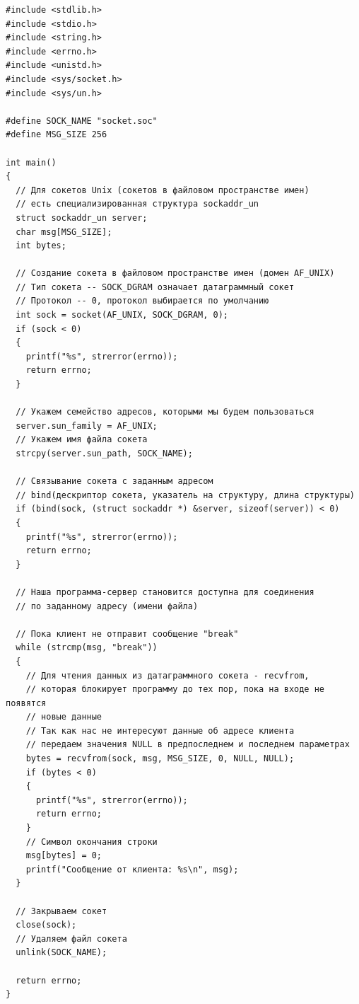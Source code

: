 \documentclass[a4paper,14pt]{extreport} %
\begin{document}
\begin{lstlisting}[caption=Код сервера]
#include <stdlib.h>
#include <stdio.h>
#include <string.h>
#include <errno.h>
#include <unistd.h>
#include <sys/socket.h>
#include <sys/un.h>

#define SOCK_NAME "socket.soc"
#define MSG_SIZE 256

int main()
{
  // Для сокетов Unix (сокетов в файловом пространстве имен)
  // есть специализированная структура sockaddr_un
  struct sockaddr_un server;
  char msg[MSG_SIZE];
  int bytes;

  // Создание сокета в файловом пространстве имен (домен AF_UNIX)
  // Тип сокета -- SOCK_DGRAM означает датаграммный сокет
  // Протокол -- 0, протокол выбирается по умолчанию
  int sock = socket(AF_UNIX, SOCK_DGRAM, 0);
  if (sock < 0)
  {
    printf("%s", strerror(errno));
    return errno;
  }

  // Укажем семейство адресов, которыми мы будем пользоваться
  server.sun_family = AF_UNIX;
  // Укажем имя файла сокета
  strcpy(server.sun_path, SOCK_NAME);

  // Связывание сокета с заданным адресом
  // bind(дескриптор сокета, указатель на структуру, длина структуры)
  if (bind(sock, (struct sockaddr *) &server, sizeof(server)) < 0)
  {
    printf("%s", strerror(errno));
    return errno;
  }

  // Наша программа-сервер становится доступна для соединения
  // по заданному адресу (имени файла)

  // Пока клиент не отправит сообщение "break"
  while (strcmp(msg, "break"))
  {
    // Для чтения данных из датаграммного сокета - recvfrom,
    // которая блокирует программу до тех пор, пока на входе не появятся 
    // новые данные
    // Так как нас не интересуют данные об адресе клиента
    // передаем значения NULL в предпоследнем и последнем параметрах
    bytes = recvfrom(sock, msg, MSG_SIZE, 0, NULL, NULL);
    if (bytes < 0)
    {
      printf("%s", strerror(errno));
      return errno;
    }
    // Символ окончания строки
    msg[bytes] = 0;
    printf("Сообщение от клиента: %s\n", msg);
  }

  // Закрываем сокет
  close(sock);
  // Удаляем файл сокета
  unlink(SOCK_NAME);

  return errno;
}
\end{lstlisting}
\end{document}

